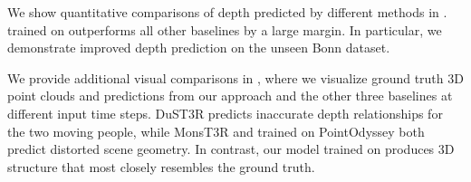 We show quantitative comparisons of depth predicted by different methods in . \method trained on \dataset outperforms all other baselines by a large margin. In particular, we demonstrate improved depth prediction on the unseen Bonn dataset.

We provide additional visual comparisons in , where we visualize ground truth 3D point clouds and predictions from our approach and the other three baselines at different input time steps. DuST3R predicts inaccurate depth relationships for the two moving people, while MonsT3R and \method trained on PointOdyssey both predict distorted scene geometry. In contrast, our model trained on \dataset produces 3D structure that most closely resembles the ground truth.











